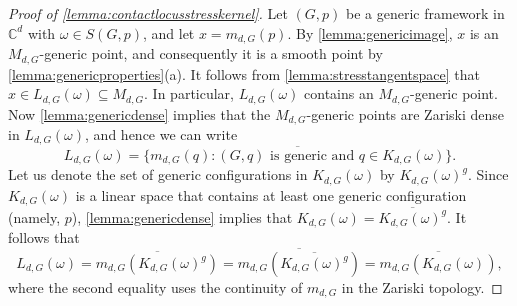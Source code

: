 \documentclass[11pt,a4paper,dvipsnames]{scrartcl}
\theoremstyle{definition}
\newcommand{\CC}{\mathbb{C}}
\newcommand{\gen}[1]{#1^g}
\newcommand{\stresskernel}[2]{K_{{#1},{#2}}}
\newcommand{\contactlocus}[2]{L_{#1,#2}}
\begin{document}
\begin{proof}[Proof of \cref{lemma:contactlocusstresskernel}]
    Let $(G,p)$ be a generic framework in $\CC^d$ with $\omega \in S(G,p)$, and let $x = m_{d,G}(p)$. By \cref{lemma:genericimage}, $x$ is an $M_{d,G}$-generic point, and consequently it is a smooth point by \cref{lemma:genericproperties}(a). It follows from \cref{lemma:stresstangentspace} that $x \in \contactlocus{d}{G}(\omega) \subseteq M_{d,G}$. In particular, $\contactlocus{d}{G}(\omega)$ contains an $M_{d,G}$-generic point. Now \cref{lemma:genericdense} implies that the $M_{d,G}$-generic points are Zariski dense in $\contactlocus{d}{G}(\omega)$, and hence we can write
\[\contactlocus{d}{G}(\omega) = \overline{\{m_{d,G}(q) : (G,q) \text{ is generic and } q \in \stresskernel{d}{G}(\omega)\}}.\]
    Let us denote the set of generic configurations in $\stresskernel{d}{G}(\omega)$ by $\gen{\stresskernel{d}{G}(\omega)}$. Since $\stresskernel{d}{G}(\omega)$ is a linear space that contains at least one generic configuration (namely, $p$), \cref{lemma:genericdense} implies that $\stresskernel{d}{G}(\omega) = \overline{\gen{\stresskernel{d}{G}(\omega)}}$. It follows that
\[\contactlocus{d}{G}(\omega) = \overline{m_{d,G}(\gen{\stresskernel{d}{G}(\omega)})} = \overline{m_{d,G}(\overline{\gen{\stresskernel{d}{G}(\omega)}})} = \overline{m_{d,G}(\stresskernel{d}{G}(\omega))},\]where the second equality uses the continuity of $m_{d,G}$ in the Zariski topology. 
\end{proof}
\end{document}
